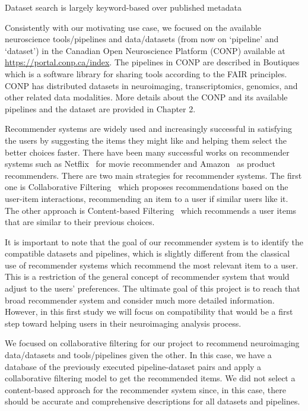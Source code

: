 Dataset search is largely keyword-based over published metadata 

Consistently with our motivating use case, we focused on the available neuroscience tools/pipelines and data/datasets (from now on `pipeline' and `dataset') in the Canadian Open Neuroscience Platform (CONP) available at \url{https://portal.conp.ca/index}. The pipelines in CONP are described in Boutiques~\cite{glatard2018boutiques} which is a software library for sharing tools according to the FAIR principles. CONP has distributed datasets in neuroimaging, transcriptomics, genomics, and other related data modalities. More details about the CONP and its available pipelines and the dataset are provided in Chapter 2.



Recommender systems are widely used and increasingly successful in satisfying the users by suggesting the items they might like and helping them select the better choices faster. There have been many successful works on recommender systems such as Netflix~\cite{bennett2007netflix} for movie recommender and Amazon~\cite{7927889} as product recommenders. There are two main strategies for recommender systems. The first one is Collaborative Filtering~\cite{rajaraman2011mining} which proposes recommendations based on the user-item interactions, recommending an item to a user if similar users like it. The other approach is Content-based Filtering~\cite{pazzani2007content} which recommends a user items that are similar to their previous choices.  

It is important to note that the goal of our recommender system is to identify the compatible datasets and pipelines, which is slightly different from the classical use of recommender systems which recommend the most relevant item to a user. This is a restriction of the general concept of recommender system that would adjust to the users' preferences. The ultimate goal of this project is to reach that broad recommender system and consider much more detailed information. However, in this first study we will focus on compatibility that would be a first step toward helping users in their neuroimaging analysis process.


We focused on collaborative filtering for our project to recommend neuroimaging data/datasets and tools/pipelines given the other. In this case, we have a database of the previously executed pipeline-dataset pairs and apply a collaborative filtering model to get the recommended items. We did not select a content-based approach for the recommender system since, in this case, there should be accurate and comprehensive descriptions for all datasets and pipelines. 
 

